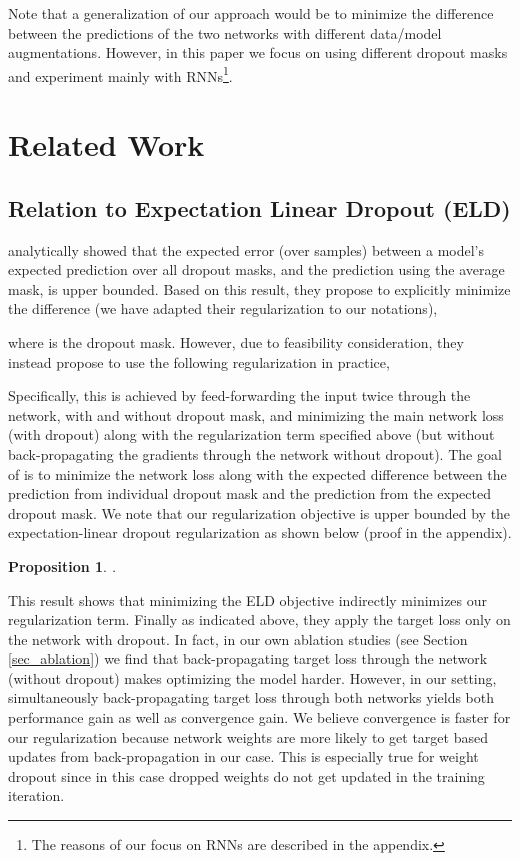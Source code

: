 \documentclass{article} \usepackage{iclr2018_conference,times}
\newtheorem{proposition}{Proposition}
\begin{document}
Note that a generalization of our approach would be to minimize the difference between the predictions of the two networks with different data/model augmentations. However, in this paper we focus on using different dropout masks and experiment mainly with RNNs\footnote{The reasons of our focus on RNNs are described in the appendix.}.

\section{Related Work}

\subsection{Relation to Expectation Linear Dropout (ELD)}

\citet{ma2016dropout} analytically showed that the expected error (over samples) between a model's expected prediction over all dropout masks, and the prediction using the average mask, is upper bounded. Based on this result, they propose to explicitly minimize the difference (we have adapted their regularization to our notations),

where  is the dropout mask. However, due to feasibility consideration, they instead propose to use the following regularization in practice,

Specifically, this is achieved by feed-forwarding the input twice through the network, with and without dropout mask, and minimizing the main network loss (with dropout) along with the regularization term specified above (but without back-propagating the gradients through the network without dropout). The goal of \citet{ma2016dropout} is to minimize the network loss along with the expected difference between the prediction from individual dropout mask and the prediction from the expected dropout mask. We note that our regularization objective is upper bounded by the expectation-linear dropout regularization as shown below (proof in the appendix).
\begin{proposition}
\label{prop_eld}
.
\end{proposition}
This result shows that minimizing the ELD objective indirectly minimizes our regularization term.
Finally as indicated above, they apply the target loss only on the network with dropout. In fact, in our own ablation studies (see Section \ref{sec_ablation}) we find that back-propagating target loss through the network (without dropout) makes optimizing the model harder. However, in our setting, simultaneously back-propagating target loss through both networks yields both performance gain as well as convergence gain. We believe convergence is faster for our regularization because network weights are more likely to get target based updates from back-propagation in our case. This is especially true for weight dropout \citep{wan2013regularization} since in this case dropped weights do not get updated in the training iteration.
\end{document}
